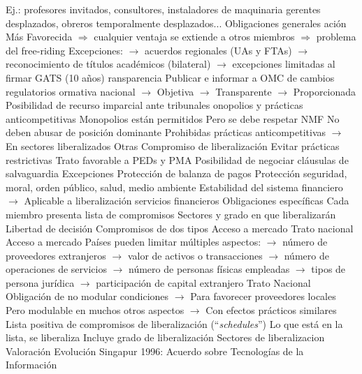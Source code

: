 \documentclass{nuevotema}
\begin{document}
\begin{esquemal}
				\4[] Ej.: profesores invitados, consultores, instaladores de maquinaria
				\4[] gerentes desplazados, obreros temporalmente desplazados...
			\3 Obligaciones generales
				\4 ación Más Favorecida
				\4[] $\Rightarrow$ cualquier ventaja se extiende a otros miembros
				\4[] $\Rightarrow$ problema del free-riding
				\4[] Excepciones:
				\4[] $\to$ acuerdos regionales (UAs y FTAs)
				\4[] $\to$ reconocimiento de títulos académicos (bilateral)
				\4[] $\to$ excepciones limitadas al firmar GATS (10 años)
				\4 ransparencia
				\4[] Publicar e informar a OMC de cambios regulatorios
				\4 ormativa nacional
				\4[] $\to$ Objetiva
				\4[] $\to$ Transparente
				\4[] $\to$ Proporcionada
				\4[] Posibilidad de recurso imparcial ante tribunales
				\4 onopolios y prácticas anticompetitivas
				\4[] Monopolios están permitidos
				\4[] Pero se debe respetar NMF
				\4[] No deben abusar de posición dominante
				\4[] Prohibidas prácticas anticompetitivas
				\4[] $\to$ En sectores liberalizados
				\4 Otras
				\4[] Compromiso de liberalización
				\4[] Evitar prácticas restrictivas
				\4[] Trato favorable a PEDs y PMA
				\4[] Posibilidad de negociar cláusulas de salvaguardia
				\4 Excepciones
				\4[] Protección de balanza de pagos
				\4[] Protección seguridad, moral, orden público, salud, medio ambiente
				\4[] Estabilidad del sistema financiero
				\4[] $\to$ Aplicable a liberalización servicios financieros
			\3 Obligaciones específicas
				\4 Cada miembro presenta lista de compromisos
				\4[$\to$] Sectores y grado en que liberalizarán
				\4[$\to$] Libertad de decisión
				\4 Compromisos de dos tipos
				\4[] Acceso a mercado
				\4[] Trato nacional
				\4 Acceso a mercado
				\4[] Países pueden limitar múltiples aspectos:
				\4[] $\to$ número de proveedores extranjeros
				\4[] $\to$ valor de activos o transacciones
				\4[] $\to$ número de operaciones de servicios
				\4[] $\to$ número de personas físicas empleadas
				\4[] $\to$ tipos de persona jurídica
				\4[] $\to$ participación de capital extranjero
				\4 Trato Nacional
				\4[] Obligación de no modular condiciones
				\4[] $\to$ Para favorecer proveedores locales
				\4[] Pero modulable en muchos otros aspectos
				\4[] $\to$ Con efectos prácticos similares
				\4 Lista positiva de compromisos de liberalización (``\textit{schedules}'')
				\4[$\to$] Lo que está en la lista, se liberaliza
				\4[] Incluye grado de liberalización
				\4[] Sectores de liberalizacion
		\2 Valoración
			\3 Evolución
				\4 Singapur 1996:
				\4[] Acuerdo sobre Tecnologías de la Información

\end{esquemal}
\end{document}
